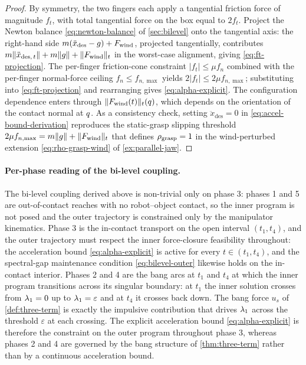 \begin{proof}
By symmetry, the two fingers each apply a tangential friction
force of magnitude $f_{t}$, with total tangential force on the
box equal to $2 f_{t}$. Project the Newton balance
\eqref{eq:newton-balance} of \cref{sec:bilevel} onto the
tangential axis: the right-hand side $m(\ddot{x}_{\mathrm{des}}
- g) + F_{\mathrm{wind}}$, projected tangentially, contributes
$m \|\ddot{x}_{\mathrm{des},\, t}\| + m \|g\| +
\|F_{\mathrm{wind}}\|_{t}$ in the worst-case alignment, giving
\eqref{eq:ft-projection}. The per-finger friction-cone
constraint $|f_{t}| \le \mu f_{n}$ combined with the per-finger
normal-force ceiling $f_{n} \le f_{n,\max}$ yields
$2|f_{t}| \le 2\mu f_{n,\max}$; substituting into
\eqref{eq:ft-projection} and rearranging gives
\eqref{eq:alpha-explicit}. The configuration dependence enters
through $\|F_{\mathrm{wind}}(t)\|_{t}(q)$, which depends on the
orientation of the contact normal at $q$. As a
consistency check, setting $\ddot{x}_{\mathrm{des}} = 0$ in
\eqref{eq:accel-bound-derivation} reproduces the static-grasp
slipping threshold $2\mu f_{n,\max} = m\|g\| +
\|F_{\mathrm{wind}}\|_{t}$ that defines $\rho_{\mathrm{grasp}} = 1$
in the wind-perturbed extension \eqref{eq:rho-grasp-wind} of
\cref{ex:parallel-jaw}.
\end{proof}

\paragraph{Per-phase reading of the bi-level coupling.}
The bi-level coupling derived above is non-trivial only on
phase 3: phases 1 and 5 are out-of-contact reaches with no
robot--object contact, so the inner program is not posed and
the outer trajectory is constrained only by the manipulator
kinematics. Phase 3 is the in-contact transport on the open
interval $(t_{1}, t_{4})$, and the outer trajectory must
respect the inner force-closure feasibility throughout: the
acceleration bound \eqref{eq:alpha-explicit} is active for
every $t \in (t_{1}, t_{4})$, and the spectral-gap maintenance
condition \eqref{eq:bilevel-outer} likewise holds on the
in-contact interior. Phases 2 and 4 are the bang arcs at
$t_{1}$ and $t_{4}$ at which the inner program transitions
across its singular boundary: at $t_{1}$ the inner solution
crosses from $\lambda_{1} = 0$ up to $\lambda_{1} = \varepsilon$ and
at $t_{4}$ it crosses back down. The bang force $u_{s}$ of
\cref{def:three-term} is exactly the impulsive contribution
that drives $\lambda_{1}$ across the threshold $\varepsilon$ at
each crossing. The explicit acceleration bound
\eqref{eq:alpha-explicit} is therefore the constraint on the
outer program throughout phase 3, whereas phases 2 and 4 are
governed by the bang structure of \cref{thm:three-term} rather
than by a continuous acceleration bound.

